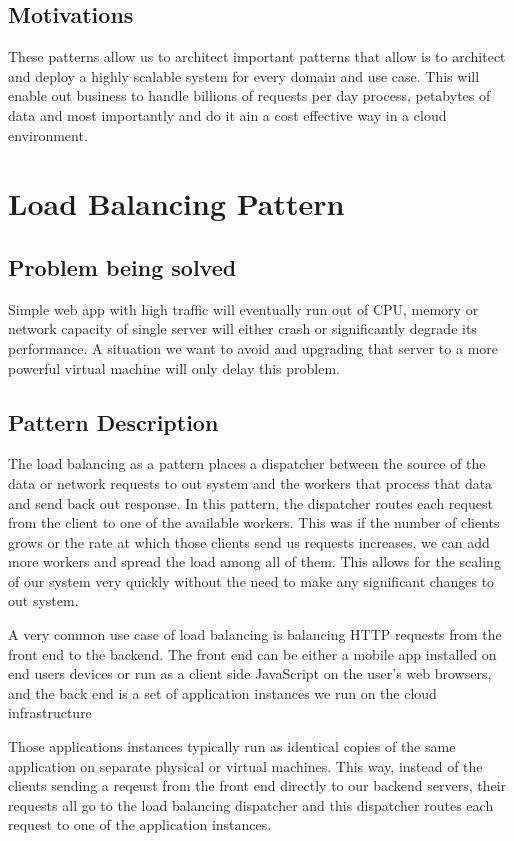 \subsection{Motivations}
These patterns allow us to architect important patterns that allow is to architect and deploy a highly scalable system for every domain and use case.
This will enable out business to handle billions of requests per day process, petabytes of data and most importantly and do it ain a cost effective way in a cloud environment.

\section{Load Balancing Pattern}

\subsection{Problem being solved}
Simple web app with high traffic will eventually run out of CPU, memory or network capacity of single server will either crash or significantly degrade its performance.
A situation we want to avoid and upgrading that server to a more powerful virtual machine will only delay this problem.

\subsection{Pattern Description}
The load balancing as a pattern places a dispatcher between the source of the data or network requests to out system and the workers that process that data and send back out response.
In this pattern, the dispatcher routes each request from the client to one of the available workers.
This was if the number of clients grows or the rate at which those clients send us requests increases, we can add more workers and spread the load among all of them.
This allows for the scaling of our system very quickly without the need to make any significant changes to out system.

A very common use case of load balancing is balancing HTTP requests from the front end to the backend.
The front end can be either a mobile app installed on end users devices or run as a client side JavaScript on the user's web browsers,
and the back end is a set of application instances we run on the cloud infrastructure

Those applications instances typically run as identical copies of the same application on separate physical or virtual machines.
This way, instead of the clients sending a reqeust from the front end directly to our backend servers, their requests all go to the load balancing dispatcher and this dispatcher routes each request to one of the application instances.

